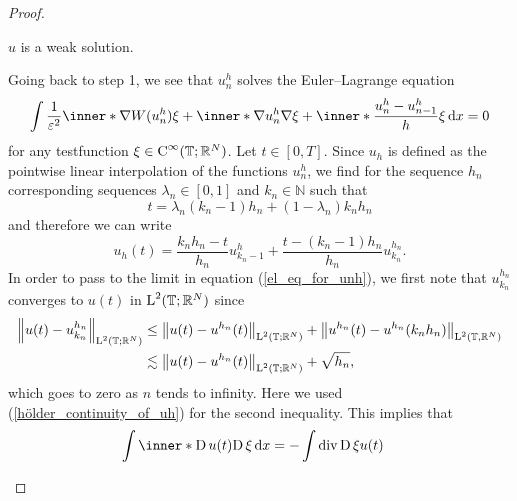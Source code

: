 \begin{proof}
\begin{description}[wide=0pt]
		\item[Step 7:] $ u $ is a weak solution.
		
		Going back to step 1, we see that $ u_{ n }^{ h } $ solves the Euler--Lagrange equation
		\begin{equation}
			\label{el_eq_for_unh}
			\int
			\frac{ 1 }{ \varepsilon^{ 2 } }
			\inner*{ \nabla W ( u_{ n }^{ h } ) }  { \xi }
			+
			\inner*{ \nabla u_{ n }^{ h } }{ \nabla \xi }
			+
			\inner*{ \frac{ u_{ n }^{ h } - u_{ n - 1 }^{ h } }{ h } }{ \xi }
			\dd{ x }
			=
			0
		\end{equation}
		for any testfunction $ \xi \in \operatorname{C}^{ \infty } ( \operatorname{\mathbb{T}} ; \mathbb{ R }^{ N } )  $.
		Let $ t \in [ 0 , T ] $. Since $ u_{ h } $ is defined as the pointwise linear interpolation of the functions $ u_{ n}^{ h } $, we find for the sequence $ h_{ n } $ corresponding sequences $ \lambda_{ n } \in [ 0 , 1 ] $ and $ k_{ n } \in \mathbb{ N }$ such that 
		\begin{equation*}
			t = \lambda_{ n } ( k_{ n } - 1 ) h_{ n } + ( 1 - \lambda_{ n } ) k_{ n } h_{ n } 
		\end{equation*}
		and therefore we can write
		\begin{equation*}
			u_{ h } ( t ) 
			=
			\frac{ k_{ n } h_{ n } - t }{ h_{ n } } u_{ k_{ n } - 1 }^{ h }
			+
			\frac{ t - ( k_{ n } - 1 ) h_{ n } }{ h_{ n } }
			u_{ k_{ n } }^{ h_{ n } }.
		\end{equation*}
		In order to pass to the limit in equation (\ref{el_eq_for_unh}), we first note that $ u_{ k_{ n } }^{ h_{ n } } $ converges to $ u ( t ) $ in $ \operatorname{L}^{ 2 } ( \operatorname{\mathbb{T}} ; \mathbb{ R }^{ N } ) $ since
		\begin{align*}
			\norm{ u ( t ) - u_{ k_{ n } }^{ h_{ n } } }_{ \operatorname{L}^{ 2 } ( \operatorname{\mathbb{T}} ; \mathbb{ R }^{ N } ) }
			& \leq
			\norm{ u ( t ) - u^{ h_{ n } } ( t ) }_{ \operatorname{L}^{ 2 } ( \operatorname{\mathbb{T}} ; \mathbb{ R }^{ N } ) }
			+
			\norm{ u^{ h_{ n } } ( t ) - u^{ h_{ n } } ( k_{n } h_{ n } ) }_{ \operatorname{L}^{ 2 } ( \operatorname{\mathbb{T}}, \mathbb{ R }^{ N } ) }
			\\
			& \lesssim
			\norm{ u ( t ) - u^{ h_{ n } } ( t ) }_{ \operatorname{L}^{ 2 } ( \operatorname{\mathbb{T}} ; \mathbb{ R }^{ N } ) }
			+ 
			\sqrt{ h_{ n } },
		\end{align*}
		which goes to zero as $ n $ tends to infinity. Here we used 
		(\ref{hölder_continuity_of_uh}) for the second inequality.
		This implies that 
		\begin{align*}
			\int
			\inner*{ \diff u ( t ) }{ \diff \xi }
			\dd{ x }
			& = 
			-
			\int
			\divg \diff \xi u( t )

\end{align*}
\end{description}
\end{proof}
